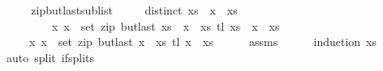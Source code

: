\begin{isabellebody}
\endisadelimproof
\ \isanewline
\isanewline
\ \ \isamarkupfalse%
\ zip{\isacharunderscore}{\kern0pt}butlast{\isacharunderscore}{\kern0pt}sublist{\isacharcolon}{\kern0pt}\isanewline
\ \ \ \ \ {\isachardoublequoteopen}distinct\ {\isacharparenleft}{\kern0pt}xs\ {\isacharat}{\kern0pt}\ x\ {\isacharhash}{\kern0pt}\ xs\isanewline
\ \ \ \ \ \ \ \ \ {\isachardoublequoteopen}{\isacharparenleft}{\kern0pt}x\ x\ {\isasymin}\ set\ {\isacharparenleft}{\kern0pt}zip\ {\isacharparenleft}{\kern0pt}butlast\ {\isacharparenleft}{\kern0pt}xs\ {\isacharat}{\kern0pt}\ x\ {\isacharhash}{\kern0pt}\ xs\ {\isacharparenleft}{\kern0pt}tl\ {\isacharparenleft}{\kern0pt}xs\ {\isacharat}{\kern0pt}\ x\ {\isacharhash}{\kern0pt}\ xs\isanewline
\ \ \ \ \ {\isachardoublequoteopen}{\isacharparenleft}{\kern0pt}x\ x\ {\isasymin}\ set\ {\isacharparenleft}{\kern0pt}zip\ {\isacharparenleft}{\kern0pt}butlast\ {\isacharparenleft}{\kern0pt}x\ {\isacharhash}{\kern0pt}\ xs\ {\isacharparenleft}{\kern0pt}tl\ {\isacharparenleft}{\kern0pt}x\ {\isacharhash}{\kern0pt}\ xs\isanewline
%
\isadelimproof
\ \ \ \ %
\endisadelimproof
%
\isatagproof
{}\isamarkupfalse%
\ assms\isanewline
\ \ \ \ \isamarkupfalse%
\ {\isacharparenleft}{\kern0pt}induction\ xs\isanewline
\ \ \ \ \isamarkupfalse%
\ {\isacharparenleft}{\kern0pt}auto\ split{\isacharcolon}{\kern0pt}\ if{\isacharunderscore}{\kern0pt}splits{\isacharparenright}{\kern0pt}\isanewline
\ \ \ \ \isamarkupfalse%

\end{isabellebody}
